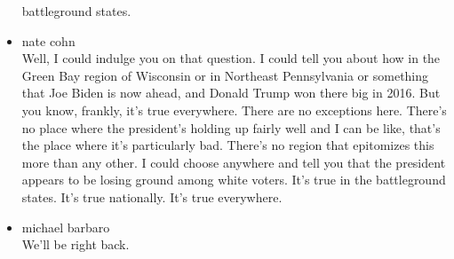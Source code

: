 \begin{itemize}
  battleground states.
\item
  nate cohn\\
  Well, I could indulge you on that question. I could tell you about how
  in the Green Bay region of Wisconsin or in Northeast Pennsylvania or
  something that Joe Biden is now ahead, and Donald Trump won there big
  in 2016. But you know, frankly, it's true everywhere. There are no
  exceptions here. There's no place where the president's holding up
  fairly well and I can be like, that's the place where it's
  particularly bad. There's no region that epitomizes this more than any
  other. I could choose anywhere and tell you that the president appears
  to be losing ground among white voters. It's true in the battleground
  states. It's true nationally. It's true everywhere.
\item
  michael barbaro\\
  We'll be right back.


\end{itemize}
